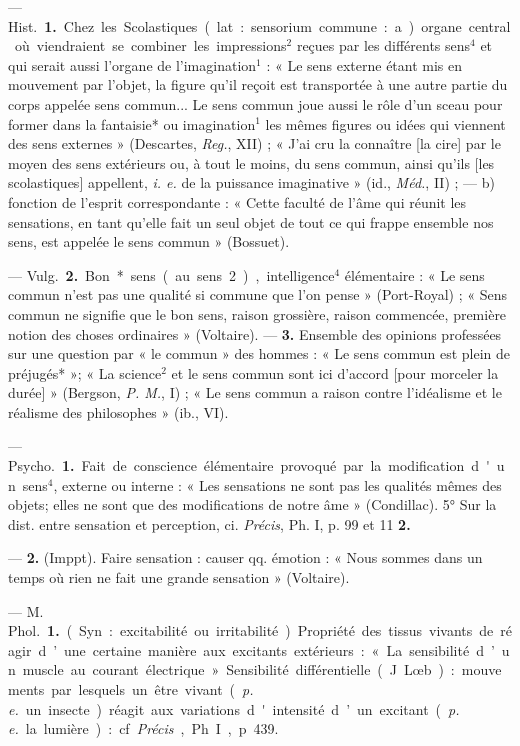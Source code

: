 \begin{itemize}[leftmargin=1cm, label=, itemsep=1pt]
 — \si{Hist.} {\bf 1.} Chez les
Scolastiques (lat. : sensorium commune :
a) organe central où viendraient se combiner les impressions$^2$
reçues par les différents sens$^4$ et qui
serait aussi l'organe de l'imagination$^1$ : « Le sens externe étant mis en
mouvement par l'objet, la figure
qu’il reçoit est transportée à une
autre partie du corps appelée sens
commun... Le sens commun joue
aussi le rôle d’un sceau pour former
dans la fantaisie* ou imagination$^1$
les mêmes figures ou idées qui viennent des sens externes » (Descartes,
{\it Reg.}, XII) ; « J'ai cru la connaître
[la cire] par le moyen des sens extérieurs ou, à tout le moins, du sens
commun, ainsi qu'ils [les scolastiques] appellent, {\it i. e.} de la puissance imaginative » (id., \si{{\it Méd.}}, II) ;
— b) fonction de l'esprit correspondante : « Cette faculté de l’âme qui
réunit les sensations, en tant qu'elle
fait un seul objet de tout ce qui
frappe ensemble nos sens, est appelée
le sens commun » (Bossuet).

— \si{Vulg.} {\bf 2.} Bon* sens (au sens 2),
intelligence$^4$ élémentaire : « Le sens
commun n’est pas une qualité si
commune que l’on pense » (Port-Royal) ; « Sens commun ne signifie
que le bon sens, raison grossière,
raison commencée, première notion
des choses ordinaires » (Voltaire). —
 {\bf 3.} Ensemble des opinions professées
sur une question par « le commun »
des hommes : « Le sens commun
est plein de préjugés* »; « La science$^2$
et le sens commun sont ici d'accord
[pour morceler la durée] » (Bergson,
{\it P. M.}, I) ; « Le sens commun a
raison contre l'idéalisme et le réalisme des philosophes » (ib., VI).

 — \si{Psycho.} {\bf 1.} Fait de
conscience élémentaire provoqué par
la modification d'un sens$^4$, externe
ou interne : « Les sensations ne sont
pas les qualités mêmes des objets;
elles ne sont que des modifications
de notre âme » (Condillac). 5° Sur
la dist. entre sensation et perception,
ci. {\it Précis}, Ph. I, p. 99 et 11 {\bf 2.}

— {\bf 2.} (Imppt). Faire sensation :
causer qq. émotion : « Nous sommes
dans un temps où rien ne fait une
grande sensation » (Voltaire).

 — M. \si{Phol.} {\bf 1.} (Syn. : excitabilité ou irritabilité). Propriété des
tissus vivants de réagir d’une certaine manière aux excitants extérieurs : « La sensibilité d’un muscle
au courant électrique ». Sensibilité
différentielle (J. Lœb) : mouvements
par lesquels un être vivant ({\it p. e.} un
insecte) réagit aux variations d'intensité d’un excitant ({\it p. e.} la lumière) : cf. {\it Précis}, Ph. I, p. 439.


\end{itemize}
